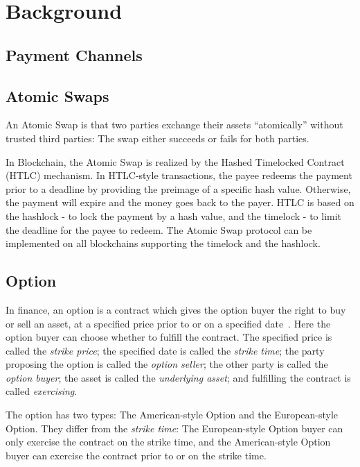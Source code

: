 \section{Background}
\label{sec:background}


\subsection{Payment Channels}

\subsection{Atomic Swaps}

An Atomic Swap is that two parties exchange their assets ``atomically'' without trusted third parties:
The swap either succeeds or fails for both parties.

In Blockchain, the Atomic Swap is realized by the Hashed Timelocked Contract (HTLC) mechanism.
In HTLC-style transactions, the payee redeems the payment prior to a deadline by providing the preimage of a specific hash value.
Otherwise, the payment will expire and the money goes back to the payer.
HTLC is based on the hashlock - to lock the payment by a hash value, and the timelock - to limit the deadline for the payee to redeem.
The Atomic Swap protocol can be implemented on all blockchains supporting the timelock and the hashlock.

\subsection{Option}

In finance, an option is a contract which gives the option buyer the right to buy or sell an asset, at a specified price prior to or on a specified date~\cite{higham2004introduction}.
Here the option buyer can choose whether to fulfill the contract.
The specified price is called the \textit{strike price};
the specified date is called the \textit{strike time};
the party proposing the option is called the \textit{option seller};
the other party is called the \textit{option buyer};
the asset is called the \textit{underlying asset};
and fulfilling the contract is called \textit{exercising}.

The option has two types: The American-style Option and the European-style Option.
They differ from the \textit{strike time}:
The European-style Option buyer can only exercise the contract on the strike time,
and the American-style Option buyer can exercise the contract prior to or on the strike time.

